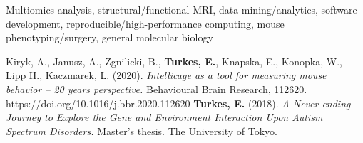 %
%
%

\vspace*{-0.2cm}

\begin{cvskills}

    {Multiomics analysis, structural/functional MRI, data mining/analytics, software
        development, reproducible/high-performance computing, mouse phenotyping/surgery, general molecular biology}

    \vspace*{-0.1cm}
    {Kiryk, A., Janusz, A., Zgnilicki, B., \textbf{Turkes, E.}, Knapska, E.,
        Konopka, W., Lipp H., Kaczmarek, L. (2020).
        \vspace*{-0.001cm}}
    \cvskill{}
    {\hspace*{20pt}\textit{Intellicage as a tool for measuring mouse behavior – 20
        years perspective.} Behavioural Brain
        \vspace*{-0.1cm}}
    \cvskill{}
    {\hspace*{20pt}Research, 112620. https://doi.org/10.1016/j.bbr.2020.112620}
    \vspace*{-0.1cm}
    \cvskill{}
    {\textbf{Turkes, E.} (2018). \textit{A Never-ending Journey to Explore the
        Gene and Environment Interaction Upon Autism}\vspace*{-0.001cm}}
    \cvskill{}
    {\hspace*{20pt}\textit{Spectrum Disorders.} Master's thesis. The University of
        Tokyo.}

\vspace*{-1cm}
\end{cvskills}
